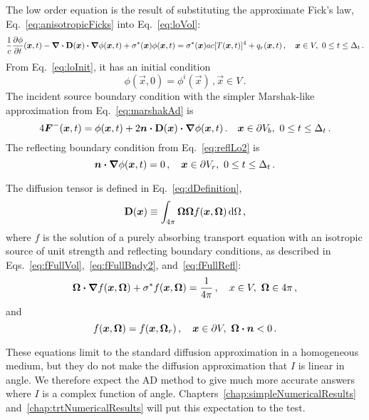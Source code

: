 The low order equation is the result of substituting the approximate Fick's law,
Eq.~\eqref{eq:anisotropicFicks} into Eq.~\eqref{eq:loVol}:
\begin{equation*}
\frac{1}{c} \frac{\partial \phi}{\partial t} (\bm{x}, t)
  - \bm{\nabla} \bm{\cdot} \mathbf{D}(\bm{x}) \bm{\cdot} \bm{\nabla} \phi(\bm{x},t)
  + \sigma^\ast(\bm{x}) \phi(\bm{x}, t)
  = \sigma^\ast(\bm{x}) ac [T(\bm{x}, t)]^4 + q_{r}(\bm{x}, t) \,,
  \quad \bm{x} \in V,\ 0 \le t \le \Delta_t \,.
\end{equation*}
From Eq.~\eqref{eq:loInit}, it has an initial condition
\begin{equation*}
\phi(\vec{x}, 0) = \phi^i(\vec{x})\,, \vec{x} \in V  \,.
\end{equation*}
The incident source boundary condition with the simpler Marshak-like
approximation from Eq.~\eqref{eq:marshakAd} is
\begin{equation*}
  4 \bm{F}^-(\bm{x}, t)
  = \phi(\bm{x}, t)
  + 2 \bm{n} \bm{\cdot} \mathbf{D}(\bm{x}) \bm{\cdot} \bm{\nabla} \phi(\bm{x}, t) \,.
 \quad \bm{x} \in \partial V_b,\ 0 \le t \le \Delta_t \,.
\end{equation*}
The reflecting boundary condition from Eq.~\eqref{eq:reflLo2} is
\begin{equation*}
  \bm{n}\bm{\cdot}\bm{\nabla} \phi(\bm{x}, t) = 0 \,,
 \quad \bm{x} \in \partial V_r,\ 0 \le t \le \Delta_t \,.
\end{equation*}

The diffusion tensor is defined in Eq.~\eqref{eq:dDefinition},
\begin{equation*}
  \mathbf{D}(\bm{x}) \equiv \int_{4\pi} \bm{\Omega} \bm{\Omega}
  f(\bm{x}, \bm{\Omega}) \mathop{}\!\mathrm{d}\Omega \,,
\end{equation*}
where $f$ is the solution of a purely absorbing transport equation with an
isotropic source of unit strength and reflecting boundary conditions, as
described in Eqs.~\eqref{eq:fFullVol},~\eqref{eq:fFullBndy2},
and~\eqref{eq:fFullRefl}:
\begin{equation*}
    \bm{\Omega}\bm{\cdot} \bm{\nabla} f(\bm{x}, \bm{\Omega})
    + \sigma^\ast f (\bm{x}, \bm{\Omega})
  = \frac{1}{4\pi} \,, \quad x \in V,\ \bm{\Omega} \in 4\pi\,,
\end{equation*}
and
\begin{equation*}
  f(\bm{x}, \bm{\Omega}) = f(\bm{x}, \bm{\Omega}_r) \,,
 \quad \bm{x} \in \partial V, \ \bm{\Omega} \bm{\cdot} \bm{n} < 0\,.
\end{equation*}

These equations limit to the standard diffusion approximation in a homogeneous
medium, but they do not make the diffusion approximation that $I$ is linear in
angle. We therefore expect the AD method to give much more accurate answers
where $I$ is a complex function of angle.
Chapters~\ref{chap:simpleNumericalResults}
and~\ref{chap:trtNumericalResults} will put this expectation to the test.

